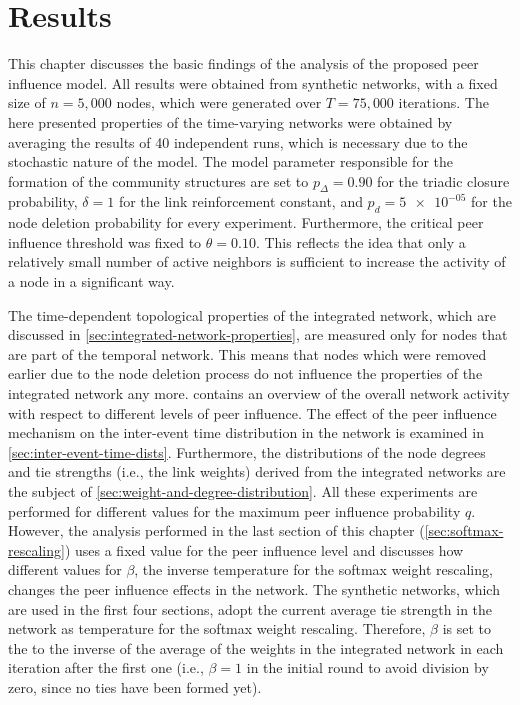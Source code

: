 \chapter{Results}
\label{cha:results}


This chapter discusses the basic findings of the analysis of the proposed peer influence model.
All results were obtained from synthetic networks, with a fixed size of \( n = 5,000 \) nodes, which were generated over \( T = 75,000 \) iterations.
The here presented properties of the time-varying networks were obtained by averaging the results of 40 independent runs, which is necessary due to the stochastic nature of the model.
The model parameter responsible for the formation of the community structures are set to \( p_{\Delta} = 0.90 \) for the triadic closure probability, \( \delta = 1 \) for the link reinforcement constant, and \( p_{d} = \num{5e-05} \) for the node deletion probability for every experiment.
Furthermore, the critical peer influence threshold was fixed to \( \theta = 0.10 \).
This reflects the idea that only a relatively small number of active neighbors is sufficient to increase the activity of a node in a significant way.

The time-dependent topological properties of the integrated network, which are discussed in \cref{sec:integrated-network-properties}, are measured only for nodes that are part of the temporal network.
This means that nodes which were removed earlier due to the node deletion process do not influence the properties of the integrated network any more.
 contains an overview of the overall network activity with respect to different levels of peer influence.
The effect of the peer influence mechanism on the inter-event time distribution in the network is examined in \cref{sec:inter-event-time-dists}.
Furthermore, the distributions of the node degrees and tie strengths (i.e., the link weights) derived from the integrated networks are the subject of \cref{sec:weight-and-degree-distribution}.
All these experiments are performed for different values for the maximum peer influence probability \( q \).
However, the analysis performed in the last section of this chapter (\cref{sec:softmax-rescaling}) uses a fixed value for the peer influence level and discusses how different values for \( \beta \), the inverse temperature for the softmax weight rescaling, changes the peer influence effects in the network.
The synthetic networks, which are used in the first four sections, adopt the current average tie strength in the network as temperature for the softmax weight rescaling.
Therefore, \( \beta \) is set to the to the inverse of the average of the weights in the integrated network in each iteration after the first one (i.e., \( \beta = 1 \) in the initial round to avoid division by zero, since no ties have been formed yet).


